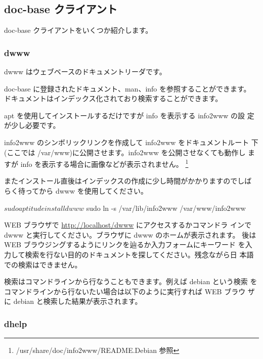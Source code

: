 \documentclass[mingoth,a4paper]{jsarticle}
\begin{document}
\subsection{doc-base クライアント}
doc-base クライアントをいくつか紹介します。


\subsubsection{dwww}
dwww はウェブベースのドキュメントリーダです。

doc-base に登録されたドキュメント、man、info を参照することができます。
ドキュメントはインデックス化されており検索することができます。


apt を使用してインストールするだけですが info を表示する info2www の設
定が少し必要です。

info2www のシンボリックリンクを作成して info2www をドキュメントルート
下(ここでは /var/www)に公開させます。info2www を公開させなくても動作し
ますが info を表示する場合に画像などが表示されません。
\footnote{/usr/share/doc/info2www/README.Debian 参照}

またインストール直後はインデックスの作成に少し時間がかかりますのでしば
らく待ってから dwww を使用してください。

\begin{commandline}
$ sudo aptitude install dwww
$ sudo ln -s /var/lib/info2www /var/www/info2www
\end{commandline}


WEB ブラウザで \url{http://localhost/dwww} にアクセスするかコマンドラ
インで dwww と実行してください。ブラウザに dwww のホームが表示されます。
後は WEB ブラウジングするようにリンクを辿るか入力フォームにキーワード
を入力して検索を行ない目的のドキュメントを探してください。残念ながら日
本語での検索はできません。

検索はコマンドラインから行なうこともできます。例えば debian という検索
をコマンドラインから行ないたい場合は以下のように実行すれば WEB ブラウ
ザに debian と検索した結果が表示されます。



\subsubsection{dhelp}
\end{document}
